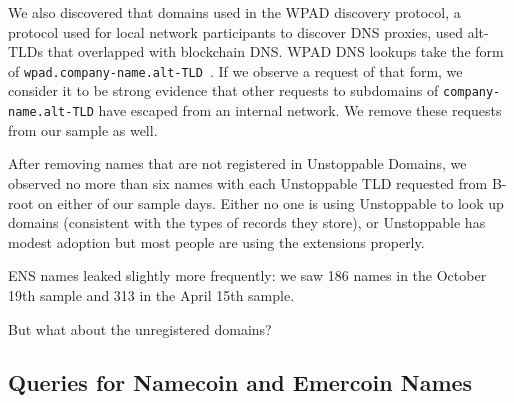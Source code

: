 We also discovered that domains used in the WPAD discovery protocol, a protocol 
used for local network participants to discover DNS proxies, used alt-TLDs that 
overlapped with blockchain DNS. WPAD DNS lookups take the form of 
\texttt{wpad.company-name.alt-TLD}~\cite{chen_wpad_2016}. If we observe a 
request of that form, we consider it to be strong evidence that other requests 
to subdomains of \texttt{company-name.alt-TLD} have escaped from an internal 
network. We remove these requests from our sample as well.

After removing names that are not registered in Unstoppable Domains, we 
observed no more than six names with each Unstoppable TLD requested from B-root 
on either of our sample days. Either no one is using Unstoppable to look up 
domains (consistent with the types of records they store), or Unstoppable has 
modest adoption but most people are using the extensions properly.

ENS names leaked slightly more frequently: we saw 186 names in the October 19th
sample and 313 in the April 15th sample. 

But what about the unregistered domains?

\subsection{Queries for Namecoin and Emercoin Names}

